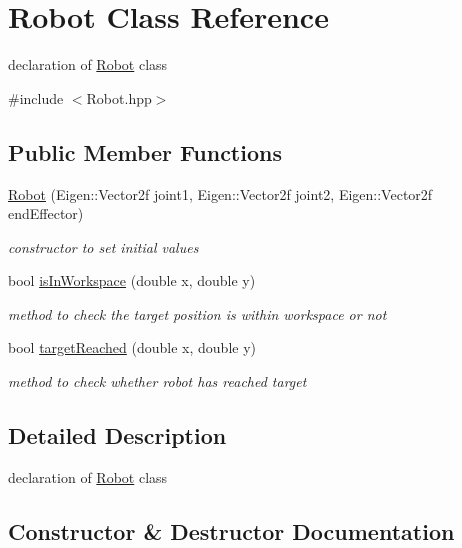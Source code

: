 \hypertarget{classRobot}{}\section{Robot Class Reference}
\label{classRobot}


declaration of \hyperlink{classRobot}{Robot} class  




{\ttfamily \#include $<$Robot.\+hpp$>$}

\subsection*{Public Member Functions}
\begin{DoxyCompactItemize}
\item 
\hyperlink{classRobot_a4ee3c5a05985c8fb238601cd8695988a}{Robot} (Eigen\+::\+Vector2f joint1, Eigen\+::\+Vector2f joint2, Eigen\+::\+Vector2f end\+Effector)
\begin{DoxyCompactList}\small\item\em constructor to set initial values \end{DoxyCompactList}\item 
bool \hyperlink{classRobot_a0badd8b7e52b51ce0eb0a97fb29fb9fe}{is\+In\+Workspace} (double x, double y)
\begin{DoxyCompactList}\small\item\em method to check the target position is within workspace or not \end{DoxyCompactList}\item 
bool \hyperlink{classRobot_a709bc25a38791ac5918b3c969af241fd}{target\+Reached} (double x, double y)
\begin{DoxyCompactList}\small\item\em method to check whether robot has reached target \end{DoxyCompactList}\end{DoxyCompactItemize}


\subsection{Detailed Description}
declaration of \hyperlink{classRobot}{Robot} class 

\subsection{Constructor \& Destructor Documentation}
